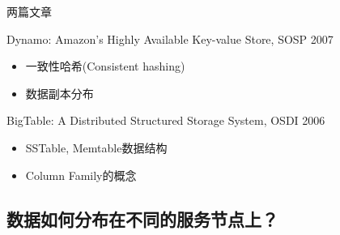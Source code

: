 \documentclass{beamer}
\begin{document}
\begin{CJK}{UTF8}{gbsn}
\begin{frame}{两篇文章}
  \begin{block}{Dynamo: Amazon’s Highly Available Key-value Store, SOSP 2007}
    \begin{itemize}
    \item {一致性哈希(Consistent hashing)}
    \item {数据副本分布}  
    \end{itemize}
  \end{block}
  \begin{block}{BigTable: A Distributed Structured Storage System, OSDI 2006}
    \begin{itemize}
    \item {SSTable, Memtable数据结构}
    \item {Column Family的概念}
    \end{itemize}
  \end{block}
\end{frame}

\subsection{数据如何分布在不同的服务节点上？}


\end{CJK}
\end{document}
